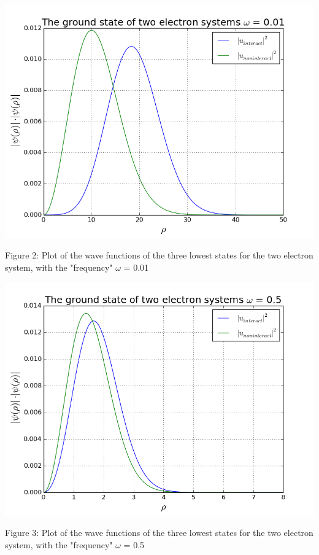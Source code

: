 \documentclass[norsk,a4paper,12pt]{article}
\begin{document}
\includegraphics[scale=0.5]{wavefunc_two_omega=0_01}\par
\vspace{1mm}
Figure 2: Plot of the wave functions of the three lowest states for the two electron  system, with the "frequency" $\omega$ = 0.01
\par
\vspace{7mm}

\includegraphics[scale=0.55]{wavefunc_two_omega=0_5}\par
\vspace{1mm}
Figure 3: Plot of the wave functions of the three lowest states for the two electron  system, with the "frequency" $\omega$ = 0.5
\par
\vspace{7mm}
\end{document}
